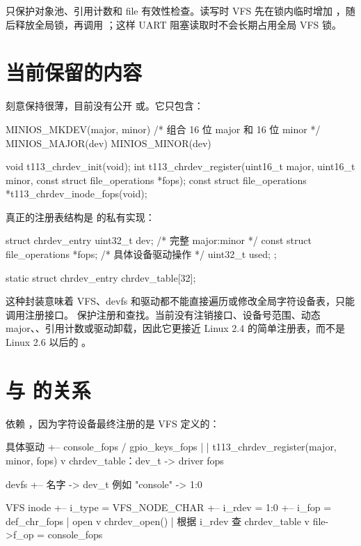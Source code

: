  只保护对象池、引用计数和 file 有效性检查。读写时 VFS 先在锁内临时增加 ，随后释放全局锁，再调用 ；这样 UART 阻塞读取时不会长期占用全局 VFS 锁。

\section{ 当前保留的内容}

 刻意保持很薄，目前没有公开  或。它只包含：

\begin{ccode}
MINIOS_MKDEV(major, minor)  /* 组合 16 位 major 和 16 位 minor */
MINIOS_MAJOR(dev)
MINIOS_MINOR(dev)

void t113_chrdev_init(void);
int t113_chrdev_register(uint16_t major, uint16_t minor,
                         const struct file_operations *fops);
const struct file_operations *t113_chrdev_inode_fops(void);
\end{ccode}

真正的注册表结构是  的私有实现：

\begin{ccode}
struct chrdev_entry {
    uint32_t dev;                         /* 完整 major:minor */
    const struct file_operations *fops;  /* 具体设备驱动操作 */
    uint32_t used;
};

static struct chrdev_entry chrdev_table[32];
\end{ccode}

这种封装意味着 VFS、devfs 和驱动都不能直接遍历或修改全局字符设备表，只能调用注册接口。 保护注册和查找。当前没有注销接口、设备号范围、动态major、、引用计数或驱动卸载，因此它更接近 Linux 2.4 的简单注册表，而不是 Linux 2.6 以后的 。

\section{ 与  的关系}

 依赖 ，因为字符设备最终注册的是 VFS 定义的：

\begin{txtcode}
具体驱动
  +-- console_fops / gpio_keys_fops
          |
          | t113_chrdev_register(major, minor, fops)
          v
chrdev_table：dev_t -> driver fops

devfs
  +-- 名字 -> dev_t
      例如 "console" -> 1:0

VFS inode
  +-- i_type = VFS_NODE_CHAR
  +-- i_rdev = 1:0
  +-- i_fop = def_chr_fops
                    | open
                    v
              chrdev_open()
                    | 根据 i_rdev 查 chrdev_table
                    v
              file->f_op = console_fops
\end{txtcode}


